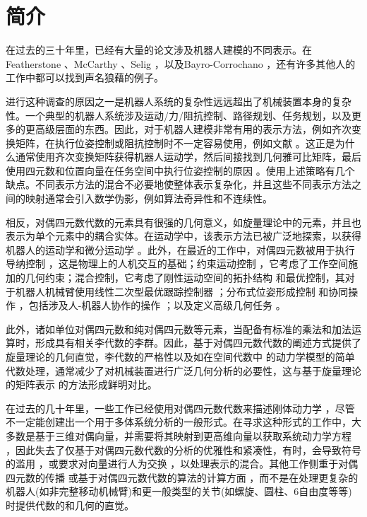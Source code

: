 
\section{\normalfont\bfseries 简介}

在过去的三十年里，已经有大量的论文涉及机器人建模的不同表示。在Featherstone \cite{Featherstone2008Book,Featherstone2010,Featherstone2010a}、McCarthy \cite{McCarthyBook1990,Dooley1991,Perez2004}、Selig \cite{Selig2004,Selig2005}，以及Bayro-Corrochano \cite{Selig2010}，还有许多其他人的工作中都可以找到声名狼藉的例子。

进行这种调查的原因之一是机器人系统的复杂性远远超出了机械装置本身的复杂性。一个典型的机器人系统涉及运动/力/阻抗控制、路径规划、任务规划，以及更多的更高级层面的东西。因此，对于机器人建模非常有用的表示方法，例如齐次变换矩阵，在执行位姿控制或阻抗控制时不一定容易使用，例如文献 \cite{Yuan1988}。这正是为什么通常使用齐次变换矩阵获得机器人运动学，然后间接找到几何雅可比矩阵，最后使用四元数和位置向量在任务空间中执行位姿控制的原因 \cite{Xian2004}。使用上述策略有几个缺点。不同表示方法的混合不必要地使整体表示复杂化，并且这些不同表示方法之间的映射通常会引入数学伪影，例如算法奇异性和不连续性。

相反，对偶四元数代数的元素具有很强的几何意义，如旋量理论中的元素，并且也表示为单个元素中的耦合实体。在运动学中，该表示方法已被广泛地探索，以获得机器人的运动学和微分运动学 \cite{Perez2004,Adorno2011,Gouasmi2012,Cohen2016,Ozgur2016,Kong2017,Dantam2020}。此外，在最近的工作中，对偶四元数被用于执行导纳控制 \cite{Fonseca2020}，这是物理上的人机交互的基础；约束运动控制 \cite{Marinho2019,Quiroz-Omana2019}，它考虑了工作空间施加的几何约束；混合控制，它考虑了刚性运动空间的拓扑结构 \cite{Kussaba2017} 和最优控制，其对于机器人机械臂使用线性二次型最优跟踪控制器 \cite{Marinho2015}；分布式位姿形成控制 \cite{Savino2020} 和协同操作 \cite{Adorno2010,Figueredo2014IROS}，包括涉及人-机器人协作的操作 \cite{Adorno2015}；以及定义高级几何任务 \cite{Lana2015}。

此外，诸如单位对偶四元数和纯对偶四元数等元素，当配备有标准的乘法和加法运算时，形成具有相关李代数的李群。因此，基于对偶四元数代数的阐述方式提供了旋量理论的几何直觉，李代数的严格性以及如在空间代数中 \cite{Featherstone2008Book} 的动力学模型的简单代数处理，通常减少了对机械装置进行广泛几何分析的必要性，这与基于旋量理论的矩阵表示 \cite{Huang2015,Renda2017} 的方法形成鲜明对比。

在过去的几十年里，一些工作已经使用对偶四元数代数来描述刚体动力学 \cite{Yang1964,Yang1966,Yang1967,Yang1971}，尽管不一定能创建出一个用于多体系统分析的一般形式。在寻求这种形式的工作中，大多数是基于三维对偶向量，并需要将其映射到更高维向量以获取系统动力学方程
\cite{Pennock1983,Dooley1991,Shoham1993,Valverde2018a}，因此失去了仅基于对偶四元数代数的分析的优雅性和紧凑性，有时，会导致符号的滥用
\cite{Dooley1991}，或要求对向量进行人为交换 \cite{Valverde2018}，以处理表示的混合。其他工作侧重于对偶四元数的传播 \cite{Hachicho2000} 或基于对偶四元数代数的算法的计算方面 \cite{MirandadeFarias2019}，而不是在处理更复杂的机器人(如非完整移动机械臂)和更一般类型的关节(如螺旋、圆柱、$6$自由度等等)时提供代数的和几何的直觉。

